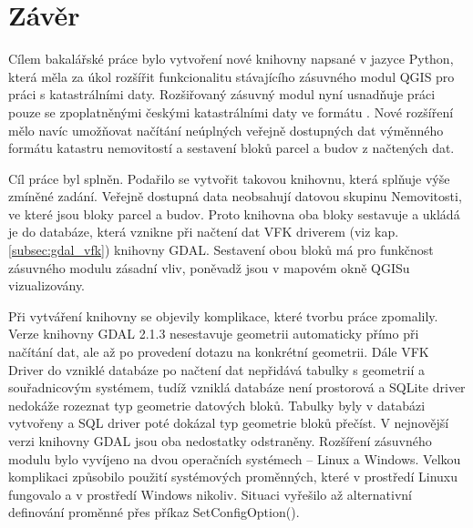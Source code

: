 \chapter{Závěr}
\label{5-zaver}

Cílem bakalářské práce bylo vytvoření nové knihovny napsané v jazyce
Python, která měla za úkol rozšířit funkcionalitu stávajícího
zásuvného modul QGIS pro práci s katastrálními daty. Rozšiřovaný
zásuvný modul nyní usnadňuje práci pouze se zpoplatněnými českými
katastrálními daty ve formátu . Nové rozšíření mělo navíc
umožňovat načítání neúplných veřejně dostupných dat výměnného formátu
katastru nemovitostí a sestavení bloků parcel a budov z načtených dat.

Cíl práce byl splněn. Podařilo se vytvořit takovou knihovnu, která
splňuje výše zmíněné zadání.
Veřejně dostupná data neobsahují datovou skupinu Nemovitosti, ve které
jsou bloky parcel a budov. Proto knihovna oba bloky sestavuje
a ukládá je do databáze, která vznikne při načtení dat VFK driverem
(viz kap. \ref{subsec:gdal_vfk}) knihovny GDAL. Sestavení obou bloků
má pro funkčnost zásuvného modulu zásadní vliv, poněvadž jsou v
mapovém okně QGISu vizualizovány.

Při vytváření knihovny se objevily komplikace, které tvorbu práce
zpomalily. Verze knihovny GDAL 2.1.3 nesestavuje geometrii automaticky
přímo při načítání dat, ale až po provedení dotazu na konkrétní
geometrii. Dále VFK Driver do vzniklé databáze po načtení dat
nepřidává tabulky s geometrií a souřadnicovým systémem, tudíž vzniklá
databáze není prostorová a SQLite driver nedokáže rozeznat typ geometrie datových
bloků. Tabulky byly v databázi vytvořeny a SQL driver poté dokázal typ
geometrie bloků přečíst. V nejnovější verzi knihovny GDAL jsou oba
nedostatky odstraněny. Rozšíření zásuvného modulu bylo vyvíjeno na
dvou operačních systémech -- Linux a Windows. Velkou komplikaci
způsobilo použití systémových proměnných, které v prostředí Linuxu
fungovalo a v prostředí Windows nikoliv. Situaci vyřešilo až
alternativní definování proměnné přes příkaz SetConfigOption().

